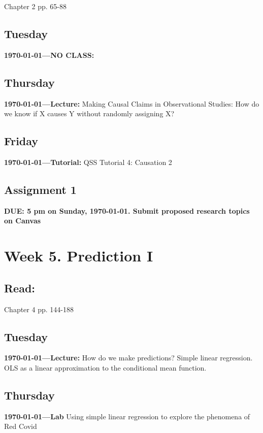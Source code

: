 \citet{Imai2022-pm} Chapter 2 pp. 65-88


\subsection{Tuesday} \textbf{\today---NO CLASS:} 


\AdvanceDate[2]

\subsection{Thursday} \textbf{\today---Lecture:}  Making Causal Claims in Observational Studies: How do we know if X causes Y without randomly assigning X? 

\AdvanceDate[1]
\subsection{Friday} \textbf{\today---Tutorial:} QSS Tutorial 4: Causation 2
\AdvanceDate[2]

\vspace{2em}

\subsection{Assignment 1} \textbf{DUE: 5 pm on Sunday, \today. Submit proposed research topics on Canvas}

\AdvanceDate[2]


\vspace{2em}

\section{Week 5. Prediction I}

\subsection{Read:}

\citet{Imai2022-pm} Chapter 4 pp. 144-188


\subsection{Tuesday} \textbf{\today---Lecture:} How do we make predictions? Simple linear regression. OLS as a linear approximation to the conditional mean function. 
\AdvanceDate[2]

\subsection{Thursday} \textbf{\today---Lab} Using simple linear regression to explore the phenomena of Red Covid 

